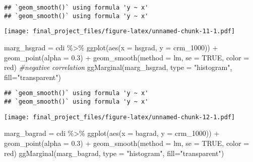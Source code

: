 \documentclass[
]{article}
\newenvironment{Shaded}{\begin{snugshade}}{\end{snugshade}}
\newcommand{\AttributeTok}[1]{\textcolor[rgb]{0.77,0.63,0.00}{#1}}
\newcommand{\CommentTok}[1]{\textcolor[rgb]{0.56,0.35,0.01}{\textit{#1}}}
\newcommand{\ConstantTok}[1]{\textcolor[rgb]{0.00,0.00,0.00}{#1}}
\newcommand{\FloatTok}[1]{\textcolor[rgb]{0.00,0.00,0.81}{#1}}
\newcommand{\FunctionTok}[1]{\textcolor[rgb]{0.00,0.00,0.00}{#1}}
\newcommand{\NormalTok}[1]{#1}
\newcommand{\OtherTok}[1]{\textcolor[rgb]{0.56,0.35,0.01}{#1}}
\newcommand{\SpecialCharTok}[1]{\textcolor[rgb]{0.00,0.00,0.00}{#1}}
\newcommand{\StringTok}[1]{\textcolor[rgb]{0.31,0.60,0.02}{#1}}
\begin{document}
\begin{verbatim}
## `geom_smooth()` using formula 'y ~ x'
## `geom_smooth()` using formula 'y ~ x'
\end{verbatim}

\texttt{[image: final\_project\_files/figure-latex/unnamed-chunk-11-1.pdf]}

\begin{Shaded}
\begin{Highlighting}[]
\NormalTok{marg\_hsgrad }\OtherTok{=}\NormalTok{ cdi }\SpecialCharTok{\%\textgreater{}\%} \FunctionTok{ggplot}\NormalTok{(}\FunctionTok{aes}\NormalTok{(}\AttributeTok{x =}\NormalTok{ hsgrad, }\AttributeTok{y =}\NormalTok{ crm\_1000)) }\SpecialCharTok{+} \FunctionTok{geom\_point}\NormalTok{(}\AttributeTok{alpha =} \FloatTok{0.3}\NormalTok{) }\SpecialCharTok{+} \FunctionTok{geom\_smooth}\NormalTok{(}\AttributeTok{method =} \StringTok{\textquotesingle{}lm\textquotesingle{}}\NormalTok{, }\AttributeTok{se =} \ConstantTok{TRUE}\NormalTok{, }\AttributeTok{color =} \StringTok{\textquotesingle{}red\textquotesingle{}}\NormalTok{) }\CommentTok{\#negative correlation}
\FunctionTok{ggMarginal}\NormalTok{(marg\_hsgrad, }\AttributeTok{type =} \StringTok{"histogram"}\NormalTok{, }\AttributeTok{fill=}\StringTok{"transparent"}\NormalTok{)}
\end{Highlighting}
\end{Shaded}

\begin{verbatim}
## `geom_smooth()` using formula 'y ~ x'
## `geom_smooth()` using formula 'y ~ x'
\end{verbatim}

\texttt{[image: final\_project\_files/figure-latex/unnamed-chunk-12-1.pdf]}

\begin{Shaded}
\begin{Highlighting}[]
\NormalTok{marg\_bagrad }\OtherTok{=}\NormalTok{ cdi }\SpecialCharTok{\%\textgreater{}\%} \FunctionTok{ggplot}\NormalTok{(}\FunctionTok{aes}\NormalTok{(}\AttributeTok{x =}\NormalTok{ bagrad, }\AttributeTok{y =}\NormalTok{ crm\_1000)) }\SpecialCharTok{+} \FunctionTok{geom\_point}\NormalTok{(}\AttributeTok{alpha =} \FloatTok{0.3}\NormalTok{) }\SpecialCharTok{+} \FunctionTok{geom\_smooth}\NormalTok{(}\AttributeTok{method =} \StringTok{\textquotesingle{}lm\textquotesingle{}}\NormalTok{, }\AttributeTok{se =} \ConstantTok{TRUE}\NormalTok{, }\AttributeTok{color =} \StringTok{\textquotesingle{}red\textquotesingle{}}\NormalTok{)}
\FunctionTok{ggMarginal}\NormalTok{(marg\_bagrad, }\AttributeTok{type =} \StringTok{"histogram"}\NormalTok{, }\AttributeTok{fill=}\StringTok{"transparent"}\NormalTok{)}
\end{Highlighting}
\end{Shaded}
\end{document}
